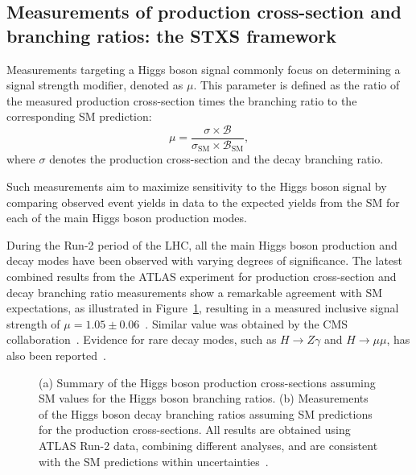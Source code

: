 \subsection{Measurements of production cross-section and branching ratios: the STXS framework}
\label{sec:stxs_yukawa}
Measurements targeting a Higgs boson signal commonly focus on determining a signal strength modifier, denoted as $\mu$. This parameter is defined as the ratio of the measured production cross-section times the branching ratio to the corresponding SM prediction:
\begin{equation}
\label{signal_strength}
    \mu = \frac{\sigma \times \mathcal{B}}{\sigma_{\mathrm{SM}} \times \mathcal{B}_{\mathrm{SM}}},
\end{equation}
where $\sigma$ denotes the production cross-section and  the decay branching ratio.

Such measurements aim to maximize sensitivity to the Higgs boson signal by comparing observed event yields in data to the expected yields from the SM for each of the main Higgs boson production modes.

During the Run-2 period of the LHC, all the main Higgs boson production and decay modes have been observed with varying degrees of significance. The latest combined results from the ATLAS experiment for production cross-section and decay branching ratio measurements show a remarkable agreement with SM expectations, as illustrated in Figure~\ref{fig:higgs_mu}, resulting in a measured inclusive signal strength of $\mu = 1.05 \pm 0.06$~\cite{Nature_ATLAS}. Similar value was obtained by the CMS collaboration~\cite{CMS:2022dwd}. Evidence for rare decay modes, such as $H \to Z\gamma$ and $H \to \mu\mu$, has also been reported~\cite{Aad_2024,muon2021}.

\begin{figure}[htbp]
    \centering
    \hfill
    \caption{(a) Summary of the Higgs boson production cross-sections assuming SM values for the Higgs boson branching ratios. 
    (b) Measurements of the Higgs boson decay branching ratios assuming SM predictions for the production cross-sections. 
    All results are obtained using ATLAS Run-2 data, combining different analyses, and are consistent with the SM predictions within uncertainties~\cite{Nature_ATLAS}.}
    \label{fig:higgs_mu}
\end{figure}


